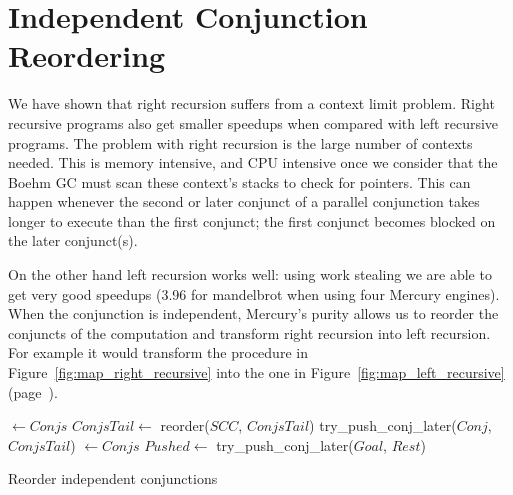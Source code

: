 
\section{Independent Conjunction Reordering}
\label{sec:rts_reorder}

We have shown that right recursion suffers from a context limit problem.
Right recursive programs also get smaller speedups when compared with left
recursive programs.
The problem with right recursion is the large number of contexts needed.
This is memory intensive, and CPU intensive once we consider that
the Boehm GC must scan these context's stacks to check for pointers.
This can happen whenever the second or later
conjunct of a parallel conjunction
takes longer to execute than the first conjunct;
the first conjunct becomes blocked on the later conjunct(s).

On the other hand left recursion works well:
using work stealing we are able to get very good speedups (3.96 for
mandelbrot when using four Mercury engines).
When the conjunction is independent,
Mercury's purity allows us to reorder the conjuncts of the computation and
transform right recursion into left recursion.
For example it would transform the procedure in
Figure~\ref{fig:map_right_recursive} into the one in
Figure~\ref{fig:map_left_recursive} (page~\pageref{fig:map_right_recursive}).

\begin{algorithm}
\begin{algorithmic}[1]
        \State \Return \nil
    \Else
        \State {} $\gets Conjs$
        \State $ConjsTail \gets$ reorder($SCC$, $ConjsTail$)
            \State \Return {}
        \Else
            \State \Return try\_push\_conj\_later($Conj$, $ConjsTail$)
        \EndIf
    \EndIf
\EndProcedure
{}
        \State \Return {}
    \Else
        \State {} $\gets Conjs$
            \State $Pushed \gets$ try\_push\_conj\_later($Goal$, $Rest$)
            \State \Return {}
        \Else
            \State \Return {}
        \EndIf
    \EndIf
\EndProcedure
\end{algorithmic}
\caption{Reorder independent conjunctions}
\label{alg:reorder_conjunction}
\end{algorithm}

